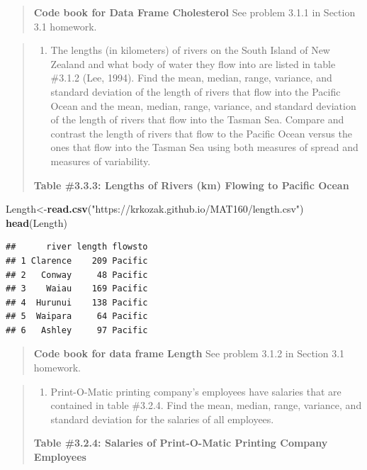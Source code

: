 \documentclass[]{book}
\newenvironment{Shaded}{\begin{snugshade}}{\end{snugshade}}
\newcommand{\KeywordTok}[1]{\textcolor[rgb]{0.13,0.29,0.53}{\textbf{#1}}}
\newcommand{\NormalTok}[1]{#1}
\newcommand{\StringTok}[1]{\textcolor[rgb]{0.31,0.60,0.02}{#1}}
\providecommand{\tightlist}{%
  \setlength{\itemsep}{0pt}\setlength{\parskip}{0pt}}
\begin{document}
\begin{quote}
\textbf{Code book for Data Frame Cholesterol} See problem 3.1.1 in Section 3.1 homework.
\end{quote}

\begin{quote}
\begin{enumerate}
\def\labelenumi{\arabic{enumi}.}
\setcounter{enumi}{1}
\tightlist
\item
  The lengths (in kilometers) of rivers on the South Island of New Zealand and what body of water they flow into are listed in table \#3.1.2 (Lee, 1994). Find the mean, median, range, variance, and standard deviation of the length of rivers that flow into the Pacific Ocean and the mean, median, range, variance, and standard deviation of the length of rivers that flow into the Tasman Sea. Compare and contrast the length of rivers that flow to the Pacific Ocean versus the ones that flow into the Tasman Sea using both measures of spread and measures of variability.
\end{enumerate}

\textbf{Table \#3.3.3: Lengths of Rivers (km) Flowing to Pacific Ocean}
\end{quote}

\begin{Shaded}
\begin{Highlighting}[]
\NormalTok{Length<-}\KeywordTok{read.csv}\NormalTok{(}\StringTok{"https://krkozak.github.io/MAT160/length.csv"}\NormalTok{)}
\KeywordTok{head}\NormalTok{(Length)}
\end{Highlighting}
\end{Shaded}

\begin{verbatim}
##      river length flowsto
## 1 Clarence    209 Pacific
## 2   Conway     48 Pacific
## 3    Waiau    169 Pacific
## 4  Hurunui    138 Pacific
## 5  Waipara     64 Pacific
## 6   Ashley     97 Pacific
\end{verbatim}

\begin{quote}
\textbf{Code book for data frame Length} See problem 3.1.2 in Section 3.1 homework.
\end{quote}

\begin{quote}
\begin{enumerate}
\def\labelenumi{\arabic{enumi}.}
\setcounter{enumi}{2}
\tightlist
\item
  Print-O-Matic printing company's employees have salaries that are contained in table \#3.2.4. Find the mean, median, range, variance, and standard deviation for the salaries of all employees.
\end{enumerate}

\textbf{Table \#3.2.4: Salaries of Print-O-Matic Printing Company Employees}
\end{quote}
\end{document}
